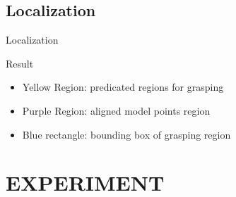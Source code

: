 \documentclass[xcolor=table,compress,blue]{beamer}
\begin{document}
\subsection{Localization}
\begin{frame}{Localization}
	\begin{exampleblock}{Result}
		\begin{itemize}
		\item \footnotesize{Yellow Region: predicated regions for grasping }
		\item \footnotesize{Purple Region: aligned model points region }
		\item \footnotesize{Blue rectangle: bounding box of grasping region }
		\end{itemize}
	\end{exampleblock}
\end{frame}



\section{EXPERIMENT}
\end{document}
